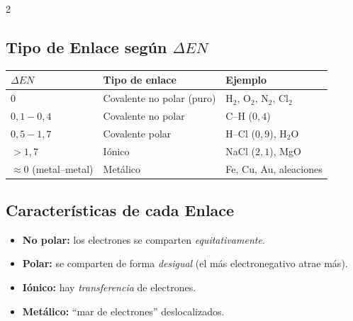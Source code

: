 \documentclass[9pt, landscape, letterpaper]{extarticle}
\begin{document}

\begin{multicols}{2}

  \subsection{Tipo de Enlace según $\Delta EN$}

  \begin{tablabox}[$\Delta EN = |EN_1 - EN_2|$]
    \tablacompacta
    \begin{tabular}{@{}l l l@{}}
      \toprule
      $\Delta EN$           & Tipo de enlace              & Ejemplo              \\
      \midrule
      $0$                   & Covalente no polar (puro)   & H$_2$, O$_2$, N$_2$, Cl$_2$ \\
      $0{,}1 - 0{,}4$       & Covalente no polar          & C--H ($0{,}4$)       \\
      $0{,}5 - 1{,}7$       & Covalente polar             & H--Cl ($0{,}9$), H$_2$O \\
      $> 1{,}7$             & Iónico                      & NaCl ($2{,}1$), MgO  \\
      $\approx 0$ (metal--metal) & Metálico               & Fe, Cu, Au, aleaciones \\
      \bottomrule
    \end{tabular}
  \end{tablabox}

  \subsection{Características de cada Enlace}

  \begin{notabox}
    \begin{itemize}
      \item \textbf{No polar:} los electrones se comparten
            \emph{equitativamente}.
      \item \textbf{Polar:} se comparten de forma \emph{desigual}
            (el más electronegativo atrae más).
      \item \textbf{Iónico:} hay \emph{transferencia} de electrones.
      \item \textbf{Metálico:} ``mar de electrones'' deslocalizados.
    \end{itemize}
  \end{notabox}


\end{multicols}
\end{document}
